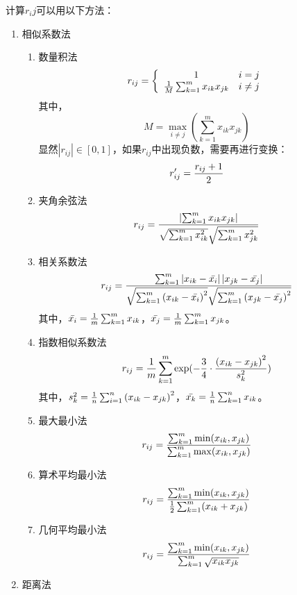 计算$r_ij$可以用以下方法： 
\begin{enumerate}[label=（\arabic*）]
	\item 相似系数法
	
	\begin{enumerate}[label=（\alph*）]
		\item 数量积法
		\begin{equation}
			r_{ij} = \left\lbrace 
			\begin{array}{cl}
			1 & i=j \\
			{1\over M}\sum_{k=1}^{m} x_{ik}x_{jk} &  i\neq j
			\end{array}
			\right. 
		\end{equation}
		其中，$$ M = \max\limits_{i\neq j}\left( \sum_{k=1}^{m} x_{ik}x_{jk}   \right)  $$
		显然$\left| r_{ij} \right| \in[0,1]$，如果$r_{ij}$中出现负数，需要再进行变换：$$ r_{ij}^\prime = {r_{ij}+1\over 2}$$
		\item 夹角余弦法
		\begin{equation}
			r_{ij} = {\left| \sum_{k=1}^{m} x_{ik}x_{jk}  \right| 
				\over 
				\sqrt{\sum_{k=1}^{m} x_{ik}^2 }\sqrt{\sum_{k=1}^{m} x_{jk}^2 }}
		\end{equation}
		\item 相关系数法
		\begin{equation}
			r_{ij} = { \sum_{k=1}^{m} \left| x_{ik}-\bar{x_i} \right|  \left| x_{jk}-\bar{x_j}  \right| 
				\over 
				\sqrt{\sum_{k=1}^{m} {(x_{ik}-\bar{x_i})}^2 }\sqrt{\sum_{k=1}^{m} {(x_{jk}-\bar{x_j})}^2 }}
		\end{equation}
		其中，$\bar{x_i} = {1\over m} \sum_{k=1}^{m} x_{ik}$，$\bar{x_j} = {1\over m} \sum_{k=1}^{m} x_{jk}$。
		\item 指数相似系数法
		\begin{equation}
			r_{ij} = {1\over m} \sum_{k=1}^{m} \mathrm{exp}(-{3\over 4}\cdot {{(x_{ik}-x_{jk})}^2\over s_k^2})
		\end{equation}
		其中，$s_k^2 = {1\over n}\sum_{i=1}^{n}{(x_{ik}-x_{jk})}^2$，$\bar{x_k} = {1\over n}\sum_{k=1}^{n}x_{ik}$。
		\item 最大最小法
		\begin{equation}
			r_{ij} = {\sum_{k=1}^{m} \min (x_{ik},x_{jk})
				 \over
				 \sum_{k=1}^{m} \max (x_{ik},x_{jk})}
		\end{equation}
		\item 算术平均最小法
			\begin{equation}
			r_{ij} = {\sum_{k=1}^{m} \min (x_{ik},x_{jk})
				\over
				{1\over 2}\sum_{k=1}^{m} (x_{ik}+x_{jk})}
			\end{equation}
		\item 几何平均最小法
			\begin{equation}
			r_{ij} = {\sum_{k=1}^{m} \min (x_{ik},x_{jk})
				\over
				\sum_{k=1}^{m} \sqrt{x_{ik}x_{jk}}}
			\end{equation}
	\end{enumerate}
	\item 距离法
	

\end{enumerate}
